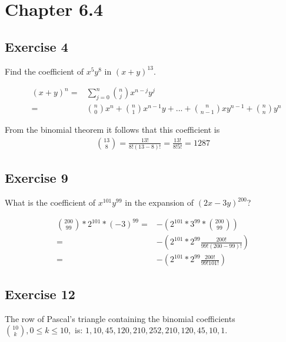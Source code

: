 \documentclass[12pt]{article}
\begin{document}
    \section{Chapter 6.4} 
    \subsection{Exercise 4}
    Find the coefficient of $x^5y^8$ in $(x+y)^{13}$.

    \begin{figure}
        \begin{equation}
            \begin{split}
                (x+y)^n =&\sum_{j=0}^{n}\binom{n}{j} x^{n-j}y^j\\=& \binom{n}{0}x^n+\binom{n}{1}x^{n-1}y+...+\binom{n}{n-1}xy^{n-1}+\binom{n}{n}y^n
            \end{split}
        \end{equation}
    \end{figure}
    
    
    From the binomial theorem it follows that this coefficient is
    \begin{equation}
        \begin{split}
            \binom{13}{8}= 
            \frac{13!}{8!(13-8)!}=
            \frac{13!}{8!5!}=
            1 287
        \end{split}
    \end{equation}

    \subsection{Exercise 9} 
    What is the coefficient of $x^{101}y^{99}$ in the expansion of $(2x-3y)^{200}$?
    
    \begin{equation}
        \begin{split}
            \binom{200}{99}*2^{101}*(-3)^{99}=& -(2^{101}*3^{99}*\binom{200}{99}) \\
            =& - (2^{101}*2^{99}\frac{200!}{99!(200-99)!}) \\
            =& - (2^{101}*2^{99}\frac{200!}{99!101!}) 
        \end{split}
    \end{equation}


    \subsection{Exercise 12}
    The row of Pascal's triangle containing the binomial coefficients ${10 \choose k}, 0 \leq k \leq 10,$ is: $1, 10, 45, 120, 210, 252, 210, 120, 45, 10, 1$.
\end{document}
